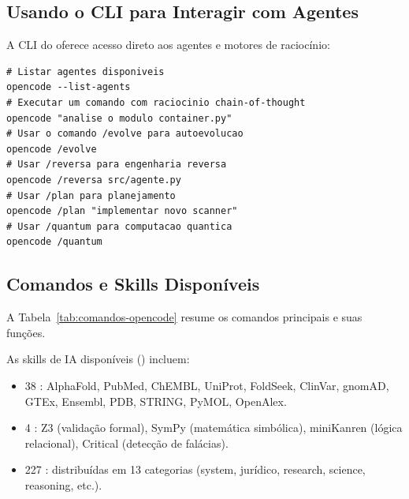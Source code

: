 \subsection{Usando o CLI para Interagir com Agentes}
A CLI do \opencodeeco{} oferece acesso direto aos agentes e motores
de raciocínio:
\begin{lstlisting}[style=bashstyle]
# Listar agentes disponiveis
opencode --list-agents
# Executar um comando com raciocinio chain-of-thought
opencode "analise o modulo container.py"
# Usar o comando /evolve para autoevolucao
opencode /evolve
# Usar /reversa para engenharia reversa
opencode /reversa src/agente.py
# Usar /plan para planejamento
opencode /plan "implementar novo scanner"
# Usar /quantum para computacao quantica
opencode /quantum
\end{lstlisting}
\subsection{Comandos e Skills Disponíveis}
A Tabela~\ref{tab:comandos-opencode} resume os comandos principais e suas
funções.
\begin{table}[htb]
\centering
    \small
\caption{Comandos do OpenCode CLI}
\label{tab:comandos-opencode}
\end{table}
As skills de IA disponíveis (\cite{opencode2026scanner, opencode2026spec036})
incluem:
\begin{itemize}
\item 38 : AlphaFold, PubMed, ChEMBL, UniProt,
FoldSeek, ClinVar, gnomAD, GTEx, Ensembl, PDB, STRING, PyMOL, OpenAlex.
\item 4 : Z3 (validação formal), SymPy (matemática
simbólica), miniKanren (lógica relacional), Critical (detecção de falácias).
\item 227 : distribuídas em 13 categorias (system,
jurídico, research, science, reasoning, etc.).
\end{itemize}
